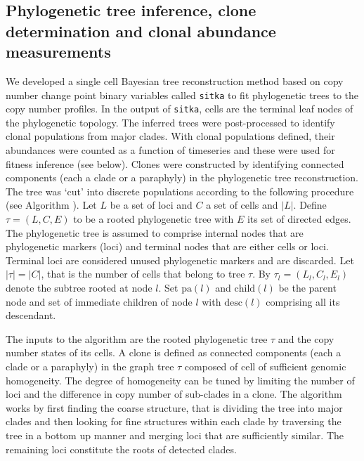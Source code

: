 \subsection{Phylogenetic tree inference, clone determination and clonal abundance measurements}
\label{ssec:phylo}
We developed a single cell Bayesian tree reconstruction method based on copy number change point binary variables called \texttt{sitka} \cite{dorri2020efficient} to fit phylogenetic trees to the copy number profiles.  
In the output of \texttt{sitka}, cells are the terminal leaf nodes of the phylogenetic topology.  
The inferred trees were post-processed to identify clonal populations from major clades. With clonal populations defined, their abundances were counted as a function of timeseries and these were used for fitness inference (see below). 
Clones were constructed by identifying connected components (each a clade or a paraphyly) in the phylogenetic tree reconstruction. The tree was `cut' into discrete populations according to the following procedure (see Algorithm \cite{salehi2020single}).
Let $L$ be a set of loci and $C$ a set of cells and ${\lvert}L{\rvert}$. 
Define $\tau = (L, C, E)$ to be a rooted phylogenetic tree with $E$ its set of directed edges.
The phylogenetic tree is assumed to comprise internal nodes that are phylogenetic markers (loci) and terminal nodes that are either cells or loci. 
Terminal loci are considered unused phylogenetic markers and are discarded. 
Let ${\lvert}\tau{\rvert} = {\lvert}C{\rvert}$, that is the number of cells that belong to tree $\tau$.
By $\tau_{l} = (L_l, C_l, E_l)$ denote the subtree rooted at node $l$.
Set $\text{pa}(l)$ and $\text{child}(l)$ be the parent node and set of immediate children of node $l$ with $\text{desc}(l)$ comprising all its descendant. 

The inputs to the algorithm are the rooted phylogenetic tree $\tau$ and the copy number states of its cells.
A clone is defined as connected components (each a clade or a paraphyly) in the graph tree $\tau$ composed of cell of sufficient genomic homogeneity. 
The degree of homogeneity can be tuned by limiting the number of loci and the difference in copy number of sub-clades in a clone. 
The algorithm works by first finding the coarse structure, that is dividing the tree into major clades and then looking for fine structures within each clade by traversing the tree in a bottom up manner and merging loci that are sufficiently similar.
The remaining loci constitute the roots of detected clades.

